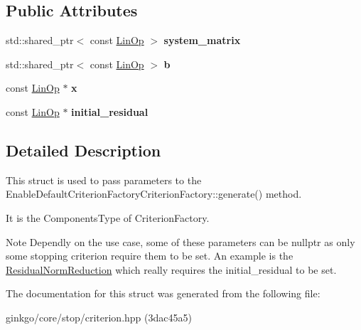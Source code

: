 \subsection*{Public Attributes}
\begin{DoxyCompactItemize}
\item 
\mbox{\label{structgko_1_1stop_1_1CriterionArgs_a2aa22bea76fd64352a446cf6c5570807}} 
std\+::shared\+\_\+ptr$<$ const \hyperlink{classgko_1_1LinOp}{Lin\+Op} $>$ {\bfseries system\+\_\+matrix}
\item 
\mbox{\label{structgko_1_1stop_1_1CriterionArgs_a994457497657a0308c5343e711ec4c3e}} 
std\+::shared\+\_\+ptr$<$ const \hyperlink{classgko_1_1LinOp}{Lin\+Op} $>$ {\bfseries b}
\item 
\mbox{\label{structgko_1_1stop_1_1CriterionArgs_a766a5c79ca77e74703888786e0011a73}} 
const \hyperlink{classgko_1_1LinOp}{Lin\+Op} $\ast$ {\bfseries x}
\item 
\mbox{\label{structgko_1_1stop_1_1CriterionArgs_af7233105d01a9b055b15652daf179a67}} 
const \hyperlink{classgko_1_1LinOp}{Lin\+Op} $\ast$ {\bfseries initial\+\_\+residual}
\end{DoxyCompactItemize}


\subsection{Detailed Description}
This struct is used to pass parameters to the Enable\+Default\+Criterion\+Factory\+Criterion\+Factory\+::generate() method. 

It is the Components\+Type of Criterion\+Factory.

\begin{DoxyNote}{Note}
Dependly on the use case, some of these parameters can be {\ttfamily nullptr} as only some stopping criterion require them to be set. An example is the {\ttfamily \hyperlink{classgko_1_1stop_1_1ResidualNormReduction}{Residual\+Norm\+Reduction}} which really requires the {\ttfamily initial\+\_\+residual} to be set. 
\end{DoxyNote}


The documentation for this struct was generated from the following file\+:\begin{DoxyCompactItemize}
\item 
ginkgo/core/stop/criterion.\+hpp (3dac45a5)\end{DoxyCompactItemize}
